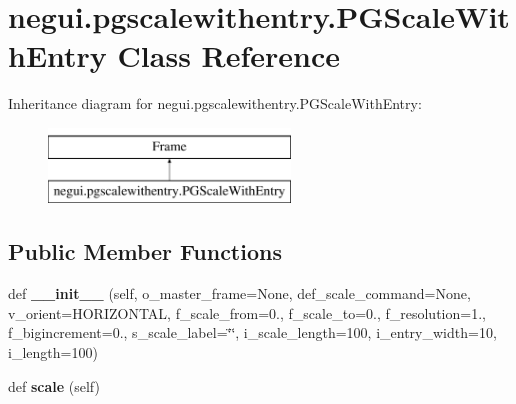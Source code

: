 \hypertarget{classnegui_1_1pgscalewithentry_1_1PGScaleWithEntry}{}\section{negui.\+pgscalewithentry.\+P\+G\+Scale\+With\+Entry Class Reference}
\label{classnegui_1_1pgscalewithentry_1_1PGScaleWithEntry}
Inheritance diagram for negui.\+pgscalewithentry.\+P\+G\+Scale\+With\+Entry\+:\begin{figure}[H]
\begin{center}
\leavevmode
\includegraphics[height=2.000000cm]{classnegui_1_1pgscalewithentry_1_1PGScaleWithEntry}
\end{center}
\end{figure}
\subsection*{Public Member Functions}
\begin{DoxyCompactItemize}
\item 
def {\bfseries \+\_\+\+\_\+init\+\_\+\+\_\+} (self, o\+\_\+master\+\_\+frame=None, def\+\_\+scale\+\_\+command=None, v\+\_\+orient=H\+O\+R\+I\+Z\+O\+N\+T\+AL, f\+\_\+scale\+\_\+from=0., f\+\_\+scale\+\_\+to=0., f\+\_\+resolution=1., f\+\_\+bigincrement=0., s\+\_\+scale\+\_\+label=\char`\"{}\char`\"{}, i\+\_\+scale\+\_\+length=100, i\+\_\+entry\+\_\+width=10, i\+\_\+length=100)\hypertarget{classnegui_1_1pgscalewithentry_1_1PGScaleWithEntry_a2871d0739183bf1e175f00c1f09fb938}{}\label{classnegui_1_1pgscalewithentry_1_1PGScaleWithEntry_a2871d0739183bf1e175f00c1f09fb938}

\item 
def {\bfseries scale} (self)\hypertarget{classnegui_1_1pgscalewithentry_1_1PGScaleWithEntry_a5232fad319cde9e832a8ba418b83d053}{}\label{classnegui_1_1pgscalewithentry_1_1PGScaleWithEntry_a5232fad319cde9e832a8ba418b83d053}

\end{DoxyCompactItemize}
